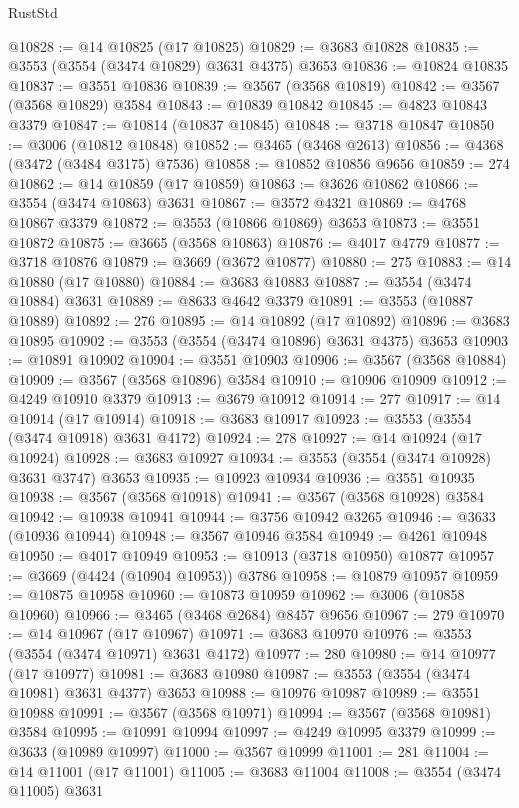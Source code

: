 \begin{lexlean}{RustStd}
\begin{coremodule}
@10828 := @14 @10825 (@17 @10825)
@10829 := @3683 @10828
@10835 := @3553 (@3554 (@3474 @10829) @3631 @4375) @3653
@10836 := @10824 @10835
@10837 := @3551 @10836
@10839 := @3567 (@3568 @10819)
@10842 := @3567 (@3568 @10829) @3584
@10843 := @10839 @10842
@10845 := @4823 @10843 @3379
@10847 := @10814 (@10837 @10845)
@10848 := @3718 @10847
@10850 := @3006 (@10812 @10848)
@10852 := @3465 (@3468 @2613)
@10856 := @4368 (@3472 (@3484 @3175) @7536)
@10858 := @10852 @10856 @9656
@10859 := 274
@10862 := @14 @10859 (@17 @10859)
@10863 := @3626 @10862
@10866 := @3554 (@3474 @10863) @3631
@10867 := @3572 @4321
@10869 := @4768 @10867 @3379
@10872 := @3553 (@10866 @10869) @3653
@10873 := @3551 @10872
@10875 := @3665 (@3568 @10863)
@10876 := @4017 @4779
@10877 := @3718 @10876
@10879 := @3669 (@3672 @10877)
@10880 := 275
@10883 := @14 @10880 (@17 @10880)
@10884 := @3683 @10883
@10887 := @3554 (@3474 @10884) @3631
@10889 := @8633 @4642 @3379
@10891 := @3553 (@10887 @10889)
@10892 := 276
@10895 := @14 @10892 (@17 @10892)
@10896 := @3683 @10895
@10902 := @3553 (@3554 (@3474 @10896) @3631 @4375) @3653
@10903 := @10891 @10902
@10904 := @3551 @10903
@10906 := @3567 (@3568 @10884)
@10909 := @3567 (@3568 @10896) @3584
@10910 := @10906 @10909
@10912 := @4249 @10910 @3379
@10913 := @3679 @10912
@10914 := 277
@10917 := @14 @10914 (@17 @10914)
@10918 := @3683 @10917
@10923 := @3553 (@3554 (@3474 @10918) @3631 @4172)
@10924 := 278
@10927 := @14 @10924 (@17 @10924)
@10928 := @3683 @10927
@10934 := @3553 (@3554 (@3474 @10928) @3631 @3747) @3653
@10935 := @10923 @10934
@10936 := @3551 @10935
@10938 := @3567 (@3568 @10918)
@10941 := @3567 (@3568 @10928) @3584
@10942 := @10938 @10941
@10944 := @3756 @10942 @3265
@10946 := @3633 (@10936 @10944)
@10948 := @3567 @10946 @3584
@10949 := @4261 @10948
@10950 := @4017 @10949
@10953 := @10913 (@3718 @10950) @10877
@10957 := @3669 (@4424 (@10904 @10953)) @3786
@10958 := @10879 @10957
@10959 := @10875 @10958
@10960 := @10873 @10959
@10962 := @3006 (@10858 @10960)
@10966 := @3465 (@3468 @2684) @8457 @9656
@10967 := 279
@10970 := @14 @10967 (@17 @10967)
@10971 := @3683 @10970
@10976 := @3553 (@3554 (@3474 @10971) @3631 @4172)
@10977 := 280
@10980 := @14 @10977 (@17 @10977)
@10981 := @3683 @10980
@10987 := @3553 (@3554 (@3474 @10981) @3631 @4377) @3653
@10988 := @10976 @10987
@10989 := @3551 @10988
@10991 := @3567 (@3568 @10971)
@10994 := @3567 (@3568 @10981) @3584
@10995 := @10991 @10994
@10997 := @4249 @10995 @3379
@10999 := @3633 (@10989 @10997)
@11000 := @3567 @10999
@11001 := 281
@11004 := @14 @11001 (@17 @11001)
@11005 := @3683 @11004
@11008 := @3554 (@3474 @11005) @3631

\end{coremodule}
\end{lexlean}
